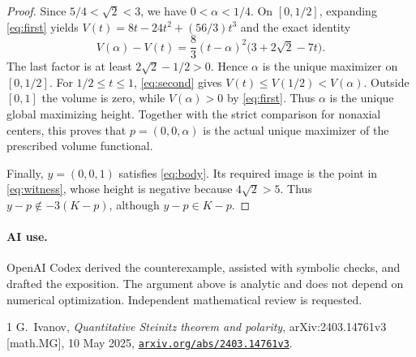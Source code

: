 \documentclass[11pt]{article}
\begin{document}
\begin{proof}
Since $5/4<\sqrt2<3$, we have $0<\alpha<1/4$.
On $[0,1/2]$, expanding \eqref{eq:first} yields
$V(t)=8t-24t^2+(56/3)t^3$ and the exact identity
\begin{equation}\label{eq:maximum}
 V(\alpha)-V(t)
 =\frac83(t-\alpha)^2\bigl(3+2\sqrt2-7t\bigr).
\end{equation}
The last factor is at least $2\sqrt2-1/2>0$. Hence $\alpha$ is the
unique maximizer on $[0,1/2]$.
For $1/2\le t\le1$, \eqref{eq:second} gives
$V(t)\le V(1/2)<V(\alpha)$.
Outside $[0,1]$ the volume is zero, while $V(\alpha)>0$ by
\eqref{eq:first}. Thus $\alpha$ is the unique global maximizing height.
Together with the strict comparison for nonaxial centers, this proves
that $p=(0,0,\alpha)$ is the actual unique maximizer of the prescribed
volume functional.

Finally, $y=(0,0,1)$ satisfies \eqref{eq:body}.
Its required image is the point in \eqref{eq:witness}, whose height is
negative because $4\sqrt2>5$.
Thus $y-p\notin-3(K-p)$, although $y-p\in K-p$.
\end{proof}

\paragraph{AI use.}
OpenAI Codex derived the counterexample, assisted with symbolic checks,
and drafted the exposition. The argument above is analytic and does not
depend on numerical optimization. Independent mathematical review is
requested.

\begin{thebibliography}{1}
G.~Ivanov,
\emph{Quantitative Steinitz theorem and polarity},
arXiv:2403.14761v3 [math.MG], 10 May 2025,
\href{https://arxiv.org/html/2403.14761v3}{\texttt{arxiv.org/abs/2403.14761v3}}.
\end{thebibliography}
\end{document}
